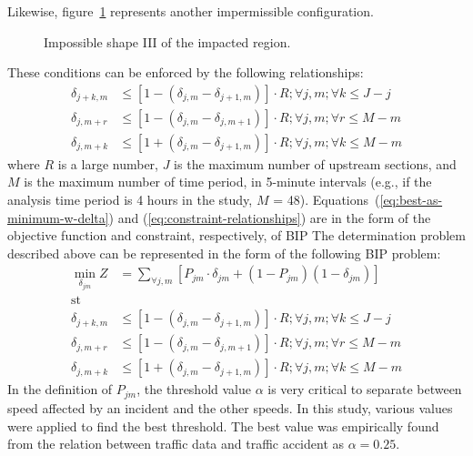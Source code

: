 \documentclass[12pt]{report}
\newcommand{\inputTikZ}[1]{%
    \begin{singlespace}
    \end{singlespace}
  }
\newcommand{\inputTikZ}[1]{%
    \begin{singlespace}
    \beginpgfgraphicnamed{#1-external}%
    \endpgfgraphicnamed%
    \end{singlespace}
  }
\newcounter{time}
\newcounter{space}
\begin{document}
Likewise, figure~\ref{fig:time-space-incident-schematic-infeasible-3}
represents another impermissible configuration.
\begin{figure}[t]
  \begin{center}
    \inputTikZ{figs/time-space-incident-schematic-infeasible-3}
    \caption[Impossible shape III of the impacted region]{Impossible shape III of the impacted region.}
    \label{fig:time-space-incident-schematic-infeasible-3}
  \end{center}
\end{figure}
These conditions can be enforced by the following relationships:
\begin{subequations}
  \label{eq:constraint-relationships}
  \begin{align}
    \label{eq:constraint-relationship-a}
    \delta_{j+k,m} &\le \left[1 - (\delta_{j,m} - \delta_{j+1,m})\right]\cdot{}R; \forall{}j, m; \forall{}k \le J - j\\
    \label{eq:constraint-relationship-b}        
    \delta_{j,m+r} & \le \left[1 - (\delta_{j,m} - \delta_{j,m+1})\right]\cdot{}R; \forall{}j, m; \forall{}r \le M - m\\
    \label{eq:constraint-relationship-c}            
    \delta_{j,m+k} & \le \left[1 + (\delta_{j,m} - \delta_{j+1,m})\right]\cdot{}R; \forall{}j, m; \forall{}k \le M - m
  \end{align}
\end{subequations}
where $R$ is a large number, $J$ is the maximum number of upstream sections, and
$M$ is the maximum number of time period, in 5-minute intervals (e.g., if the
analysis time period is 4 hours in the study, $M$ = 48).
Equations~(\ref{eq:best-as-minimum-w-delta}) and
(\ref{eq:constraint-relationships}) are in the form of the objective function
and constraint, respectively, of \ac{BIP} The determination problem described
above can be represented in the form of the following \ac{BIP} problem:
\begin{equation}
  \begin{split}
  \label{eq:bip-formulation}
  \min\limits_{\delta_{jm}} Z & = \sum\limits_{\forall{}j,m}\left[P_{jm}\cdot{}\delta_{jm}+(1-P_{jm})(1-\delta_{jm})\right] \\
  \textrm{st}~~~~~~~~~&\\
    \delta_{j+k,m} &\le \left[1 - (\delta_{j,m} - \delta_{j+1,m})\right]\cdot{}R; \forall{}j, m; \forall{}k \le J - j\\
    \delta_{j,m+r} & \le \left[1 - (\delta_{j,m} - \delta_{j,m+1})\right]\cdot{}R; \forall{}j, m; \forall{}r \le M - m\\
    \delta_{j,m+k} & \le \left[1 + (\delta_{j,m} - \delta_{j+1,m})\right]\cdot{}R; \forall{}j, m; \forall{}k \le M - m
  \end{split}
\end{equation}
In the definition of $P_{jm}$, the threshold value $\alpha$ is very
critical to separate between speed affected by an incident and the
other speeds.  In this study, various values were applied to find the
best threshold. The best value was empirically found from the relation
between traffic data and traffic accident as $\alpha = 0.25$.
\end{document}

